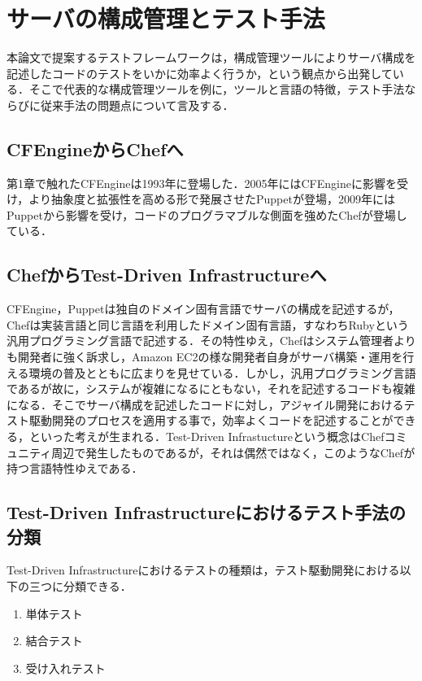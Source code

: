 \section{サーバの構成管理とテスト手法}

本論文で提案するテストフレームワークは，構成管理ツールによりサーバ構成を記述したコードのテストをいかに効率よく行うか，という観点から出発している．そこで代表的な構成管理ツールを例に，ツールと言語の特徴，テスト手法ならびに従来手法の問題点について言及する．

\subsection{CFEngineからChefへ}

第1章で触れたCFEngineは1993年に登場した．2005年にはCFEngineに影響を受け，より抽象度と拡張性を高める形で発展させたPuppet\cite{puppet}が登場，2009年にはPuppetから影響を受け，コードのプログラマブルな側面を強めたChef\cite{chef}が登場している．

\subsection{ChefからTest-Driven Infrastructureへ}

CFEngine，Puppetは独自のドメイン固有言語でサーバの構成を記述するが，Chefは実装言語と同じ言語を利用したドメイン固有言語，すなわちRuby\cite{ruby}という汎用プログラミング言語で記述する．その特性ゆえ，Chefはシステム管理者よりも開発者に強く訴求し，Amazon EC2\cite{ec2}の様な開発者自身がサーバ構築・運用を行える環境の普及とともに広まりを見せている．しかし，汎用プログラミング言語であるが故に，システムが複雑になるにともない，それを記述するコードも複雑になる．そこでサーバ構成を記述したコードに対し，アジャイル開発におけるテスト駆動開発のプロセスを適用する事で，効率よくコードを記述することができる，といった考えが生まれる．Test-Driven Infrastuctureという概念はChefコミュニティ周辺で発生したものであるが，それは偶然ではなく，このようなChefが持つ言語特性ゆえである．

\subsection{Test-Driven Infrastructureにおけるテスト手法の分類}

Test-Driven Infrastructureにおけるテストの種類は，テスト駆動開発における以下の三つに分類できる．

\begin{enumerate}
  \item 単体テスト
  \item 結合テスト
  \item 受け入れテスト
\end{enumerate}

